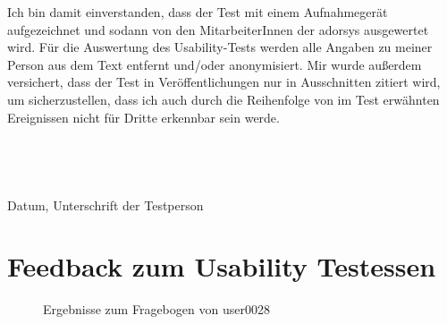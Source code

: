 Ich bin damit einverstanden, dass der Test mit einem Aufnahmegerät aufgezeichnet und sodann von den MitarbeiterInnen der adorsys ausgewertet wird. Für die Auswertung des Usability-Tests werden alle Angaben zu meiner Person aus dem Text entfernt und/oder anonymisiert. Mir wurde außerdem versichert, dass der Test in Veröffentlichungen nur in Ausschnitten zitiert wird, um sicherzustellen, dass ich auch durch die Reihenfolge von im Test erwähnten Ereignissen nicht für Dritte erkennbar sein werde. 
\\ \\ \\ \\ \\
Datum, Unterschrift der Testperson

\label{sec:anhang-einverstaendniserklaerung-feedback-ext}

\clearpage

\section{Feedback zum Usability Testessen}
\label{sec:anhang-feedback-ext}

\begin{figure}[!htb]
    \centering
    \caption{Ergebnisse zum Fragebogen von user0028}
    \label{fig:feedback-user0028-front}
\end{figure}


